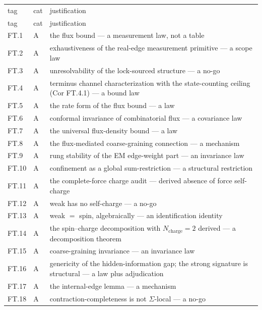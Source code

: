 \documentclass[11pt,openany]{report}
\theoremstyle{canonplain}
\theoremstyle{canondef}
\begin{document}
{\scriptsize\setlength{\tabcolsep}{4pt}
\begin{longtable}{>{\raggedright\arraybackslash}p{}|>{\raggedright\arraybackslash}p{}|>{\raggedright\arraybackslash}p{}}
\toprule
tag & cat & justification \\
\addlinespace[2pt]
\midrule
\endfirsthead
\toprule
tag & cat & justification \\
\addlinespace[2pt]
\midrule
\endhead
\bottomrule
\endlastfoot
FT.1 & A & the flux bound — a measurement law, not a table \\
FT.2 & A & exhaustiveness of the real-edge measurement primitive — a scope law \\
FT.3 & A & unresolvability of the lock-sourced structure — a no-go \\
FT.4 & A & terminus channel characterization with the state-counting ceiling (Cor FT.4.1) — a bound law \\
FT.5 & A & the rate form of the flux bound — a law \\
FT.6 & A & conformal invariance of combinatorial flux — a covariance law \\
FT.7 & A & the universal flux-density bound — a law \\
FT.8 & A & the flux-mediated coarse-graining connection — a mechanism \\
FT.9 & A & rung stability of the EM edge-weight part — an invariance law \\
FT.10 & A & confinement as a global sum-restriction — a structural restriction \\
FT.11 & A & the complete-force charge audit — derived absence of force self-charge \\
FT.12 & A & weak has no self-charge — a no-go \\
FT.13 & A & weak $=$ spin, algebraically — an identification identity \\
FT.14 & A & the spin–charge decomposition with $N_{\mathrm{charge}}=\allowbreak 2$ derived — a decomposition theorem \\
FT.15 & A & coarse-graining invariance — an invariance law \\
FT.16 & A & genericity of the hidden-information gap; the strong signature is structural — a law plus adjudication \\
FT.17 & A & the internal-edge lemma — a mechanism \\
FT.18 & A & contraction-completeness is not $\Sigma$-local — a no-go \\

\end{longtable}}
\end{document}
